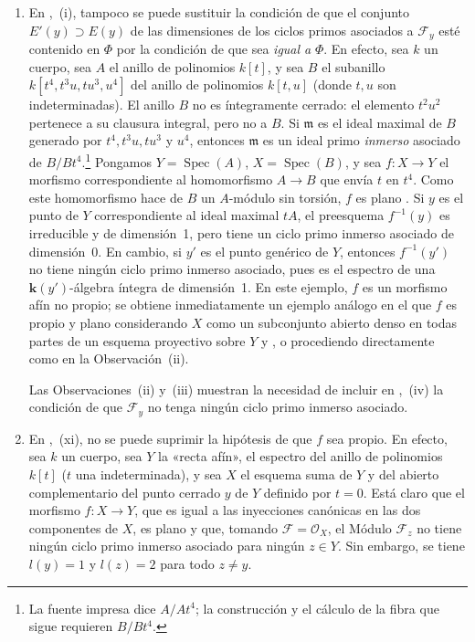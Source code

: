 \begin{remarks}[12.2.3]
\begin{enumerate}[label=(\roman*)]
  \item En ,~(i), tampoco se puede sustituir la condición de que el conjunto $E'(y)\supset E(y)$ de las dimensiones de los ciclos primos asociados a $\mathcal F_y$ esté contenido en $\Phi$ por la condición de que sea \emph{igual a} $\Phi$.
En efecto, sea $k$ un cuerpo, sea $A$ el anillo de polinomios $k[t]$, y sea $B$ el subanillo $k[t^4,t^3u,tu^3,u^4]$ del anillo de polinomios $k[t,u]$ (donde $t,u$ son indeterminadas). El anillo $B$ no es íntegramente cerrado: el elemento $t^2u^2$ pertenece a su clausura integral, pero no a $B$. Si $\mathfrak m$ es el ideal maximal de $B$ generado por $t^4,t^3u,tu^3$ y
  $u^4$, entonces $\mathfrak m$ es un ideal primo \emph{inmerso} asociado de $B/Bt^4$.\footnote{La fuente impresa dice $A/At^4$; la construcción y el cálculo de la fibra que sigue requieren $B/Bt^4$.}
Pongamos $Y=\operatorname{Spec}(A)$, $X=\operatorname{Spec}(B)$, y sea $f:X\to Y$ el morfismo correspondiente al homomorfismo $A\to B$ que envía $t$ en $t^4$.
Como este homomorfismo hace de $B$ un $A$-módulo sin torsión, $f$ es plano .
Si $y$ es el punto de $Y$ correspondiente al ideal maximal $tA$, el preesquema $f^{-1}(y)$ es irreducible y de dimensión~1, pero tiene un ciclo primo inmerso asociado de dimensión~0. En cambio, si $y'$ es el punto genérico de $Y$, entonces $f^{-1}(y')$ no tiene ningún ciclo primo inmerso asociado, pues es el espectro de una $\boldsymbol{k}(y')$-álgebra íntegra de dimensión~1. En este ejemplo, $f$ es un morfismo afín no propio; se obtiene inmediatamente un ejemplo análogo en el que $f$ es propio y plano considerando $X$ como un subconjunto abierto denso en todas partes de un esquema proyectivo sobre $Y$  y , o procediendo directamente como en la Observación~(ii).

Las Observaciones~(ii) y~(iii) muestran la necesidad de incluir en ,~(iv) la condición de que $\mathcal F_y$ no tenga ningún ciclo primo inmerso asociado.

  \item En ,~(xi), no se puede suprimir la hipótesis de que $f$ sea propio.
En efecto, sea $k$ un cuerpo, sea $Y$ la «recta afín», el espectro del anillo de polinomios $k[t]$ ($t$ una indeterminada), y sea $X$ el esquema suma de $Y$ y del abierto complementario del punto cerrado $y$ de $Y$ definido por $t=0$. Está claro que el morfismo $f:X\to Y$, que es igual a las inyecciones canónicas en las dos componentes de $X$, es plano y que, tomando $\mathcal F=\mathcal O_X$, el Módulo $\mathcal F_z$ no tiene ningún ciclo primo inmerso asociado para ningún $z\in Y$. Sin embargo, se tiene $l(y)=1$ y $l(z)=2$ para todo $z\neq y$.


\end{enumerate}
\end{remarks}
